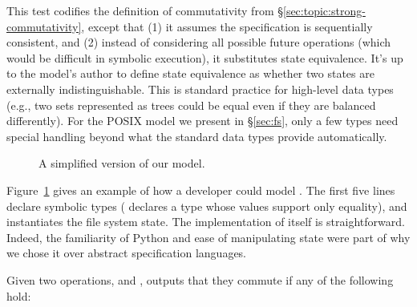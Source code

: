 This test codifies the definition of \SRI commutativity from
\S\ref{sec:topic:strong-commutativity},
except that (1) it assumes the specification is sequentially consistent,
and (2) instead of considering all possible future operations
(which would be difficult in symbolic execution), it substitutes state
equivalence.  It's up to the model's author to define state equivalence
as whether two states are externally indistinguishable.  This is
standard practice for high-level data types (e.g., two sets represented
as trees could be equal even if they are balanced differently).  For the
POSIX model we present in \S\ref{sec:fs}, only a few types need special
handling beyond
what the standard data types provide automatically.

\begin{figure}
\begin{small}

\end{small}
\caption{A simplified version of our  model.
}
\label{fig:rename-spec}
\end{figure}

Figure~\ref{fig:rename-spec} gives an example of how a developer could
model .  The first five lines declare symbolic
types ( declares a type whose values support only
equality), and  instantiates the file system state.  The
implementation of  itself is straightforward.  Indeed, the
familiarity of Python and ease of manipulating state were part of why we
chose it over abstract specification languages.

Given two
 operations,  and ,
\analyzer outputs that they commute if any of the following hold:

